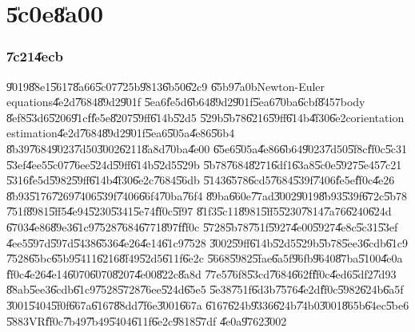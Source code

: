 \documentclass[12pt,a4paper]{article}
\begin{document}
%
\doparttoc

\part{\U{5c0e}\U{8a00}}

\section{\U{7c21}\U{4ecb}}

\U{9019}\U{88e1}\U{5617}\U{8a66}\U{5c07}\U{725b}\U{9813}\U{6b50}\U{62c9}%
\U{65b9}\U{7a0b}Newton-Euler equations\U{4e2d}\U{7684}\U{89d2}\U{901f}%
\U{5ea6}\U{fe5d}\U{6b64}\U{89d2}\U{901f}\U{5ea6}\U{70ba}\U{6cbf}\U{8457}body%
\U{8ef8}\U{53d6}\U{5206}\U{91cf}\U{fe5e}\U{8207}\U{59ff}\U{614b}\U{52d5}%
\U{529b}\U{5b78}\U{6216}\U{59ff}\U{614b}\U{4f30}\U{6e2c}orientation
estimation\U{4e2d}\U{7684}\U{89d2}\U{901f}\U{5ea6}\U{505a}\U{4e86}\U{56b4}%
\U{8b39}\U{7684}\U{9023}\U{7d50}\U{3002}\U{6211}\U{8a8d}\U{70ba}\U{4e00}%
\U{65e6}\U{505a}\U{4e86}\U{6b64}\U{9023}\U{7d50}\U{5f8c}\U{ff0c}\U{5c31}%
\U{53ef}\U{4ee5}\U{5c07}\U{76ee}\U{524d}\U{59ff}\U{614b}\U{52d5}\U{529b}%
\U{5b78}\U{7684}\U{8271}\U{6df1}\U{63a8}\U{5c0e}\U{5927}\U{5e45}\U{7c21}%
\U{5316}\U{fe5d}\U{5982}\U{59ff}\U{614b}\U{4f30}\U{6e2c}\U{7684}\U{56db}%
\U{5143}\U{6578}\U{6cd5}\U{7684}\U{539f}\U{7406}\U{fe5e}\U{ff0c}\U{4e26}%
\U{8b93}\U{5176}\U{7269}\U{7406}\U{539f}\U{7406}\U{66f4}\U{70ba}\U{76f4}%
\U{89ba}\U{660e}\U{77ad}\U{3002}\U{9019}\U{8b93}\U{539f}\U{672c}\U{5b78}%
\U{751f}\U{8981}\U{5ff5}\U{4e94}\U{5230}\U{5341}\U{5e74}\U{ff0c}\U{5f97}%
\U{81f3}\U{5c11}\U{8981}\U{5ff5}\U{5230}\U{7814}\U{7a76}\U{6240}\U{624d}%
\U{6703}\U{4e86}\U{89e3}\U{61c9}\U{7528}\U{7684}\U{6771}\U{897f}\U{ff0c}%
\U{5728}\U{5b78}\U{751f}\U{5927}\U{4e00}\U{5927}\U{4e8c}\U{5c31}\U{53ef}%
\U{4ee5}\U{597d}\U{597d}\U{5438}\U{6536}\U{4e26}\U{4e14}\U{61c9}\U{7528}%
\U{3002}\U{59ff}\U{614b}\U{52d5}\U{529b}\U{5b78}\U{5ee3}\U{6cdb}\U{61c9}%
\U{7528}\U{65bc}\U{65b9}\U{5411}\U{6216}\U{8f49}\U{52d5}\U{611f}\U{6e2c}%
\U{5668}\U{5982}\U{5fae}\U{6a5f}\U{96fb}\U{9640}\U{87ba}\U{5100}\U{4e0a}%
\U{ff0c}\U{4e26}\U{4e14}\U{6070}\U{6070}\U{8207}\U{4e00}\U{822c}\U{8a8d}%
\U{77e5}\U{76f8}\U{53cd}\U{7684}\U{662f}\U{ff0c}\U{4ed6}\U{5df2}\U{7d93}%
\U{88ab}\U{5ee3}\U{6cdb}\U{61c9}\U{7528}\U{5728}\U{76ee}\U{524d}\U{65e5}%
\U{5e38}\U{751f}\U{6d3b}\U{7576}\U{4e2d}\U{ff0c}\U{5982}\U{624b}\U{6a5f}%
\U{3001}\U{5404}\U{5f0f}\U{667a}\U{6167}\U{88dd}\U{7f6e}\U{3001}\U{667a}%
\U{6167}\U{624b}\U{9336}\U{624b}\U{74b0}\U{3001}\U{865b}\U{64ec}\U{5be6}%
\U{5883}VR\U{ff0c}\U{7b49}\U{7b49}\U{5404}\U{611f}\U{6e2c}\U{9818}\U{57df}%
\U{4e0a}\U{9762}\U{3002}
\end{document}
